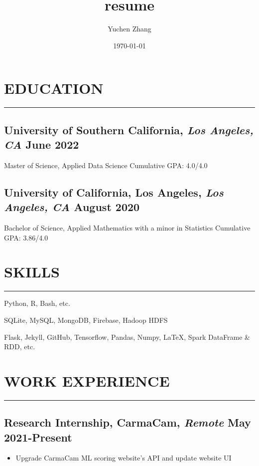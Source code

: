 \documentclass[12pt]{article}
\title{resume}
\author{Yuchen Zhang}
\date{\today}
\newcommand{\divider}{\vskip2pt{\color{black}\hrule}\vskip2pt}
\begin{document}
\section*{EDUCATION}
\divider
\subsection*{University of Southern California{\normalfont, \textit{Los Angeles, CA} \hfill June 2022}}
\noindent
Master of Science, Applied Data Science
\hfill
Cumulative GPA: 4.0/4.0

\vspace{0.1in}

\subsection*{University of California, Los Angeles{\normalfont, \textit{Los Angeles, CA} \hfill August 2020}}
\noindent
Bachelor of Science, Applied Mathematics with a minor in Statistics 
\hfill 
Cumulative GPA: 3.86/4.0

\vspace{0.1in}

\section*{SKILLS}
\divider
\vspace{3pt}
\begin{description}
    \setlength\itemsep{-1pt}
    \item[Programming Languages] Python, R, Bash, etc.
    \item[Database Management] SQLite, MySQL, MongoDB, Firebase, Hadoop HDFS
    \item[Tools] Flask, Jekyll, GitHub, Tensorflow, Pandas, Numpy, \LaTeX, 
        Spark DataFrame \& RDD, etc.
\end{description}

\section*{WORK EXPERIENCE}
\divider
\subsection*{Research Internship{\normalfont, CarmaCam, \textit{Remote} \hfill May 2021-Present}}
\begin{itemize}
    \setlength\itemsep{-1pt}
    \item Upgrade CarmaCam ML scoring website's API and update website UI
\end{itemize}
\end{document}

